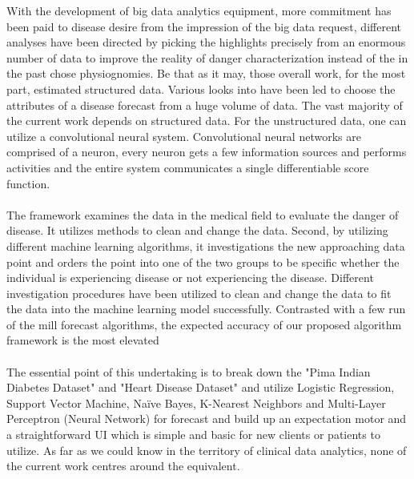 \documentclass[oneside,12pt]{Classes/VTU}
\begin{document}
    \begin{singlespacing}
   	With the development of big data analytics equipment, more commitment has been paid to disease desire from the impression of the big data request, different analyses have been directed by picking the highlights precisely from an enormous number of data to improve the reality of danger characterization instead of the in the past chose physiognomies. Be that as it may, those overall work, for the most part, estimated structured data. Various looks into have been led to choose the attributes of a disease forecast from a huge volume of data. The vast majority of the current work depends on structured data. For the unstructured data, one can utilize a convolutional neural system. Convolutional neural networks are comprised of a neuron, every neuron gets a few information sources and performs activities and the entire system communicates a single differentiable score function.
   	\paragraph{}
   	The framework examines the data in the medical field to evaluate the danger of disease. It utilizes methods to clean and change the data. Second, by utilizing different machine learning algorithms, it investigations the new approaching data point and orders the point into one of the two groups to be specific whether the individual is experiencing disease or not experiencing the disease. Different investigation procedures have been utilized to clean and change the data to fit the data into the machine learning model successfully. Contrasted with a few run of the mill forecast algorithms, the expected accuracy of our proposed algorithm framework is the most elevated
   	\paragraph{}
	The essential point of this undertaking is to break down the "Pima Indian Diabetes Dataset" and "Heart Disease Dataset" and utilize Logistic Regression, Support Vector Machine, Naïve Bayes, K-Nearest Neighbors and Multi-Layer Perceptron (Neural Network) for forecast and build up an expectation motor and a straightforward UI which is simple and basic for new clients or patients to utilize. As far as we could know in the territory of clinical data analytics, none of the current work centres around the equivalent.
	
    \end{singlespacing}
    	
\end{document}
